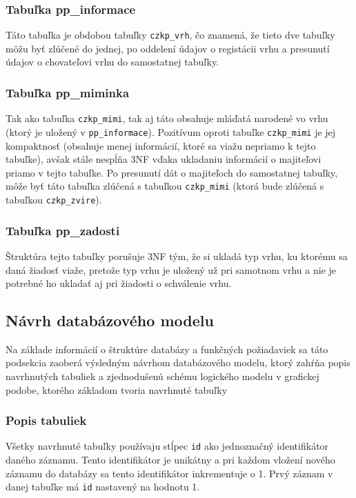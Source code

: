 \subsubsection*{Tabuľka pp\_informace}
Táto tabuľka je obdobou tabuľky \texttt{czkp_vrh}, čo znamená, že tieto dve tabuľky môžu byť zlúčené do jednej, po oddelení údajov o registácii vrhu a presunutí údajov o chovateľovi vrhu do samostatnej tabuľky.

\subsubsection*{Tabuľka pp\_miminka}
Tak ako tabuľka \texttt{czkp_mimi}, tak aj táto obsahuje mláďatá narodené vo vrhu (ktorý je uložený v \texttt{pp_informace}). Pozitívum oproti tabuľke \texttt{czkp_mimi} je jej kompaktnosť (obsahuje menej informácií, ktoré sa viažu nepriamo k tejto tabuľke), avšak stále nespĺňa 3NF vďaka ukladaniu informácií o majiteľovi priamo v tejto tabuľke. Po presunutí dát o majiteľoch do samostatnej tabuľky, môže byť táto tabuľka zlúčená s tabuľkou \texttt{czkp_mimi} (ktorá bude zlúčená s tabuľkou \texttt{czkp_zvire}).

\subsubsection*{Tabuľka pp\_zadosti}
Štruktúra tejto tabuľky porušuje 3NF tým, že si ukladá typ vrhu, ku ktorému sa daná žiadosť viaže, pretože typ vrhu je uložený 
už pri samotnom vrhu a nie je potrebné ho ukladať aj pri žiadosti o schválenie vrhu.

\subsection{Návrh databázového modelu}
Na základe informácií o štruktúre databázy a funkčných požiadaviek sa táto podsekcia zaoberá výsledným návrhom databázového modelu, ktorý zahŕňa popis navrhnutých tabuliek a zjednodušenú schému logického modelu v grafickej podobe, ktorého základom tvoria navrhnuté tabuľky

\subsubsection{Popis tabuliek}
Všetky navrhnuté tabuľky používaju stĺpec \texttt{id} ako jednoznačný identifikátor daného záznamu.
Tento identifikátor je unikátny a pri každom vložení nového záznamu do databázy sa tento identifikátor inkrementuje o 1.
Prvý záznam v danej tabuľke má \texttt{id} nastavený na hodnotu 1.

